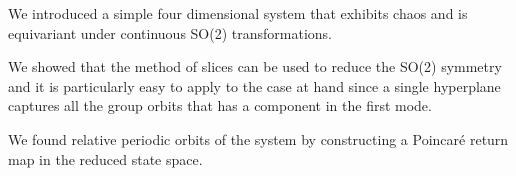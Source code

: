 \color{black}
We introduced a simple four dimensional system that exhibits chaos and is 
equivariant under continuous SO(2) transformations.
\newline

\noindent
We showed that the method of slices can be used to reduce the SO(2) symmetry
and it is particularly easy to apply to the case at hand since a single hyperplane
captures all the group orbits that has a component in the first mode.
\newline

\noindent
We found relative periodic orbits of the system by constructing a Poincar\'e 
return map in the reduced state space.
